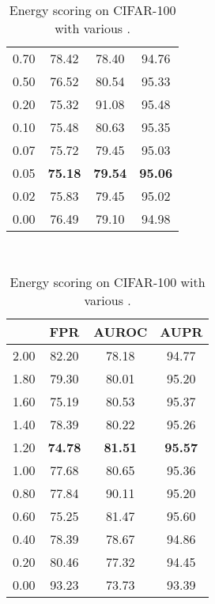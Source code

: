 \documentclass{article}
\begin{document}
\begin{table}[t]
{{\begin{tabular}{c|ccc}
0.70               & 78.42                       & 78.40                        & 94.76       \\
0.50               & 76.52                  & 80.54                  & 95.33 \\
0.20               & 75.32                  & 91.08                  & 95.48 \\
0.10               & 75.48                  & 80.63                  & 95.35 \\
0.07               & 75.72                  & 79.45                  & 95.03 \\
\cellcolor{greyC}0.05               & \cellcolor{greyC}\textbf{75.18}                  & \cellcolor{greyC}\textbf{79.54}                  & \cellcolor{greyC}\textbf{95.06} \\ 
0.02               & 75.83                  & 79.45                  & 95.02 \\
0.00               & 76.49                  & 79.10                  & 94.98 \\
\bottomrule[1.5pt]      
\end{tabular}
}
}~~
\parbox{.30\linewidth}{
\centering
\caption{Energy scoring on CIFAR-100 with various .} \label{tab: 29}
\scriptsize
\vspace{5pt}
{
\begin{tabular}{c|ccc}
\toprule[1.5pt]
         & FPR     & AUROC       & AUPR     \\
\midrule[0.6pt]
2.00               & 82.20                  & 78.18                  & 94.77 \\
1.80               & 79.30                  & 80.01                  & 95.20 \\
1.60               & 75.19                  & 80.53                  & 95.37 \\
1.40               & 78.39                  & 80.22                  & 95.26 \\
\cellcolor{greyC}1.20               & \cellcolor{greyC}\textbf{74.78}                  & \cellcolor{greyC}\textbf{81.51}                  & \cellcolor{greyC}\textbf{95.57} \\
1.00               & 77.68                  & 80.65                  & 95.36 \\
0.80               & 77.84                  & 90.11                  & 95.20 \\
0.60               & 75.25                  & 81.47                  & 95.60 \\
0.40               & 78.39                  & 78.67                  & 94.86 \\
0.20               & 80.46                  & 77.32                  & 94.45 \\
0.00               & 93.23                  & 73.73                  & 93.39 \\
\bottomrule[1.5pt]      
\end{tabular}
}
}
\end{table}
\end{document}
